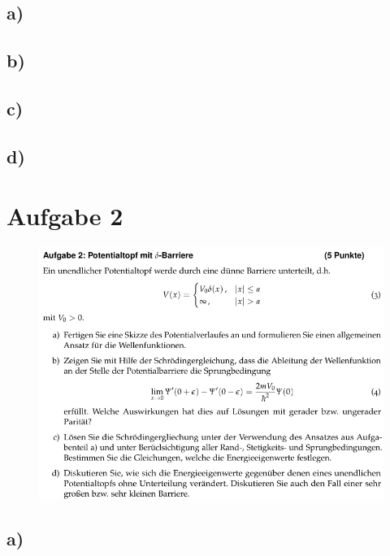     \subsection{a)}

    \subsection{b)}

    \subsection{c)}

    \subsection{d)}

\section{Aufgabe 2}

    \begin{figure}[H]
        \centering
        \includegraphics[width=\textwidth]{images/Aufgabe2.jpg}
        \label{fig:2}
    \end{figure}

    \subsection{a)}

